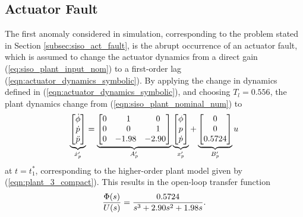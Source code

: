 \subsection{Actuator Fault}\label{subsec:siso_act_sims}
The first anomaly considered in simulation, corresponding to the problem stated in Section \ref{subsec:siso_act_fault}, is the abrupt occurrence of an actuator fault, which is assumed to change the actuator dynamics from a direct gain (\ref{eq:siso_plant_input_nom}) to a first-order lag (\ref{eqn:actuator_dynamics_symbolic}). By applying the change in dynamics defined in (\ref{eqn:actuator_dynamics_symbolic}), and choosing $T_l = 0.556$, the plant dynamics change from (\ref{eqn:siso_plant_nominal_num}) to
\begin{equation}
	\underbrace{\begin{bmatrix}
			\dot{\phi} \\ \dot{p} \\ \ddot{p}
		\end{bmatrix}}_{\dot{x}_p'} = \underbrace{\begin{bmatrix}
		0 & \hfil 1 & \hfil 0\\ 0 & \hfil 0 & \hfil 1 \\ 0 & -1.98 & -2.90
	\end{bmatrix}}_{A_p'} \underbrace{\begin{bmatrix}
			\phi \\ p \\ \dot{p}
		\end{bmatrix}}_{x_p'} + \underbrace{\begin{bmatrix}
		0 \\ 0 \\ 0.5724
	\end{bmatrix}}_{B_p'} u
	\label{eqn:plant_3}
\end{equation}
\noindent at $t = t_1^*$, corresponding to the higher-order plant model given by (\ref{eqn:plant_3_compact}). This results in the open-loop transfer function
\begin{equation}
		\frac{\Phi(s)}{U(s)} = \frac{0.5724}{s^3 + 2.90s^2 + 1.98s}.\\
\end{equation}

